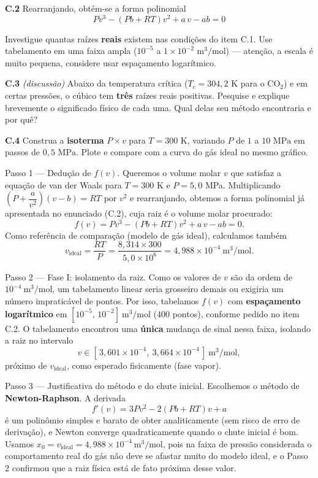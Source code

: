 \documentclass[
	12pt,				%
	openright,			%
	a4paper,			%
	english,			%
	french,				%
	spanish,			%
	brazil,				%
	]{abntex2}
\begin{document}
\textbf{C.2} Rearranjando, obtém-se a forma polinomial
\[
P v^3 - (Pb + RT) v^2 + a\,v - ab = 0
\]

Investigue quantas raízes \textbf{reais} existem nas condições do item C.1. Use tabelamento em uma faixa ampla ($10^{-5}$ a $1 \times 10^{-2}\text{ m}^3/\text{mol}$) --- atenção, a escala é muito pequena, considere usar espaçamento logarítmico.

\textbf{C.3} \textit{(discussão)} Abaixo da temperatura crítica ($T_c = 304,2\text{ K}$ para o $\text{CO}_2$) e em certas pressões, o cúbico tem \textbf{três} raízes reais positivas. Pesquise e explique brevemente o significado físico de cada uma. Qual delas seu método encontraria e por quê?

\textbf{C.4} Construa a \textbf{isoterma} $P \times v$ para $T = 300\text{ K}$, variando $P$ de $1$ a $10\text{ MPa}$ em passos de $0,5\text{ MPa}$. Plote e compare com a curva do gás ideal no mesmo gráfico.

{Passo 1 --- Dedução de $f(v)$.}
Queremos o volume molar $v$ que satisfaz a equação de van der Waals para $T=300$ K e $P=5{,}0$ MPa. Multiplicando $\left(P + \dfrac{a}{v^2}\right)(v-b) = RT$ por $v^2$ e rearranjando, obtemos a forma polinomial já apresentada no enunciado (C.2), cuja raiz é o volume molar procurado:
\[
f(v) = P v^3 - (Pb + RT)v^2 + a\,v - ab = 0 .
\]
Como referência de comparação (modelo de gás ideal), calculamos também
\[
v_{\text{ideal}} = \frac{RT}{P} = \frac{8{,}314 \times 300}{5{,}0\times10^{6}} = 4{,}988\times10^{-4}\ \text{m}^3/\text{mol}.
\]

{Passo 2 --- Fase I: isolamento da raiz.}
Como os valores de $v$ são da ordem de $10^{-4}\ \text{m}^3/\text{mol}$, um tabelamento linear seria grosseiro demais ou exigiria um número impraticável de pontos. Por isso, tabelamos $f(v)$ com \textbf{espaçamento logarítmico} em $[10^{-5},\,10^{-2}]\ \text{m}^3/\text{mol}$ (400 pontos), conforme pedido no item C.2. O tabelamento encontrou uma \textbf{única} mudança de sinal nessa faixa, isolando a raiz no intervalo
\[
v \in [\,3{,}601\times10^{-4},\ 3{,}664\times10^{-4}\,]\ \text{m}^3/\text{mol},
\]
próximo de $v_{\text{ideal}}$, como esperado fisicamente (fase vapor).

{Passo 3 --- Justificativa do método e do chute inicial.}
Escolhemos o método de \textbf{Newton-Raphson}. A derivada
\[
f'(v) = 3Pv^2 - 2(Pb+RT)v + a
\]
é um polinômio simples e barato de obter analiticamente (sem risco de erro de derivação), e Newton converge quadraticamente quando o chute inicial é bom. Usamos $x_0 = v_{\text{ideal}} = 4{,}988\times10^{-4}\ \text{m}^3/\text{mol}$, pois na faixa de pressão considerada o comportamento real do gás não deve se afastar muito do modelo ideal, e o Passo 2 confirmou que a raiz física está de fato próxima desse valor.
\end{document}
